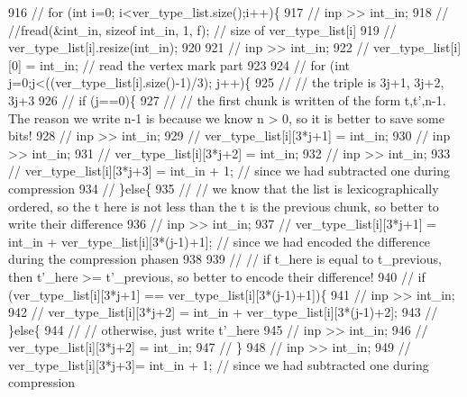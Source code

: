 \begin{DoxyCode}
916   \textcolor{comment}{// for (int i=0; i<ver\_type\_list.size();i++)\{}
917   \textcolor{comment}{//   inp >> int\_in;}
918   \textcolor{comment}{//   //fread(&int\_in, sizeof int\_in, 1, f); // size of ver\_type\_list[i]}
919   \textcolor{comment}{//   ver\_type\_list[i].resize(int\_in);}
920 
921   \textcolor{comment}{//   inp >> int\_in;}
922   \textcolor{comment}{//   ver\_type\_list[i][0] = int\_in; // read the vertex mark part}
923 
924   \textcolor{comment}{//   for (int j=0;j<((ver\_type\_list[i].size()-1)/3); j++)\{}
925   \textcolor{comment}{//     // the triple is 3j+1, 3j+2, 3j+3}
926   \textcolor{comment}{//     if (j==0)\{}
927   \textcolor{comment}{//       // the first chunk is written of the form t,t',n-1. The reason we write n-1 is because we know n
       > 0, so it is better to save some bits!}
928   \textcolor{comment}{//       inp >> int\_in;}
929   \textcolor{comment}{//       ver\_type\_list[i][3*j+1] = int\_in;}
930   \textcolor{comment}{//       inp >> int\_in;}
931   \textcolor{comment}{//       ver\_type\_list[i][3*j+2] = int\_in;}
932   \textcolor{comment}{//       inp >> int\_in;}
933   \textcolor{comment}{//       ver\_type\_list[i][3*j+3] = int\_in + 1; // since we had subtracted one during compression}
934   \textcolor{comment}{//     \}else\{}
935   \textcolor{comment}{//       // we know that the list is lexicographically ordered, so the t here is not less than the t is
       the previous chunk, so better to write their difference}
936   \textcolor{comment}{//       inp >> int\_in;}
937   \textcolor{comment}{//       ver\_type\_list[i][3*j+1] = int\_in + ver\_type\_list[i][3*(j-1)+1]; // since we had encoded the
       difference during the compression phasen}
938 
939   \textcolor{comment}{//       // if t\_here is equal to t\_previous, then t'\_here >= t'\_previous, so better to encode their
       difference!}
940   \textcolor{comment}{//       if (ver\_type\_list[i][3*j+1] == ver\_type\_list[i][3*(j-1)+1])\{}
941   \textcolor{comment}{//         inp >> int\_in;}
942   \textcolor{comment}{//         ver\_type\_list[i][3*j+2] = int\_in + ver\_type\_list[i][3*(j-1)+2];}
943   \textcolor{comment}{//       \}else\{}
944   \textcolor{comment}{//         // otherwise, just write t'\_here}
945   \textcolor{comment}{//         inp >> int\_in;}
946   \textcolor{comment}{//         ver\_type\_list[i][3*j+2] = int\_in;}
947   \textcolor{comment}{//       \}}
948   \textcolor{comment}{//       inp >> int\_in;}
949   \textcolor{comment}{//       ver\_type\_list[i][3*j+3]= int\_in + 1; // since we had subtracted one during compression}

\end{DoxyCode}
